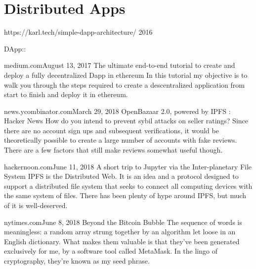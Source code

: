 
\section{Distributed Apps}

https://karl.tech/simple-dapp-architecture/ 2016

DApp:: { medium.comAugust 13, 2017 The ultimate end-to-end tutorial to
  create and deploy a fully decentralized Dapp in ethereum In this
  tutorial my objective is to walk you through the steps required to
  create a descentralized application from start to finish and deploy
  it in ethereum.

news.ycombinator.comMarch 29, 2018
OpenBazaar 2.0, powered by IPFS : Hacker News
How do you intend to prevent sybil attacks on seller ratings? Since there are no account sign ups and subsequent verifications, it would be theoretically possible to create a large number of accounts with fake reviews. There are a few factors that still make reviews somewhat useful though.

hackernoon.comJune 11, 2018
A short trip to Jupyter via the Inter-planetary File System
IPFS is the Distributed Web. It is an idea and a protocol designed to
support a distributed file system that seeks to connect all computing
devices with the same system of files. There has been plenty of hype
around IPFS, but much of it is well-deserved.

nytimes.comJune 8, 2018
Beyond the Bitcoin Bubble
The sequence of words is meaningless: a random array strung together
by an algorithm let loose in an English dictionary. What makes them
valuable is that they’ve been generated exclusively for me, by a
software tool called MetaMask. In the lingo of cryptography, they’re
known as my seed phrase.

}

